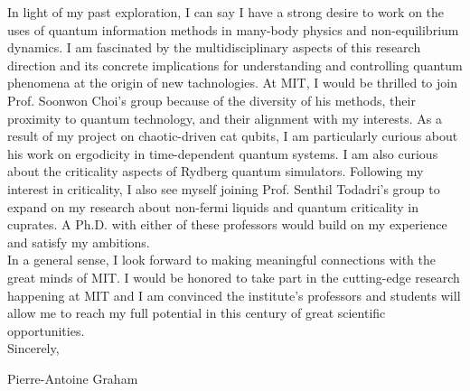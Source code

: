 \documentclass[12pt]{article}
\begin{document}
In light of my past exploration, I can say I have a strong desire to work on the uses of quantum information methods in many-body physics and non-equilibrium dynamics. I am fascinated by the multidisciplinary aspects of this research direction and its concrete implications for understanding and controlling quantum phenomena at the origin of new tachnologies. At MIT, I would be thrilled to join Prof. Soonwon Choi's group because of the diversity of his methods, their proximity to quantum technology, and their alignment with my interests. As a result of my project on chaotic-driven cat qubits, I am particularly curious about his work on ergodicity in time-dependent quantum systems. I am also curious about the criticality aspects of Rydberg quantum simulators. Following my interest in criticality, I also see myself joining Prof. Senthil Todadri's group to expand on my research about non-fermi liquids and quantum criticality in cuprates. A Ph.D. with either of these professors would build on my experience and satisfy my ambitions.\\[0.2cm]

In a general sense, I look forward to making meaningful connections with the great minds of MIT. I would be honored to take part in the cutting-edge research happening at MIT and I am convinced the institute's professors and students will allow me to reach my full potential in this century of great scientific opportunities.\\

Sincerely,

Pierre-Antoine Graham
\end{document}
